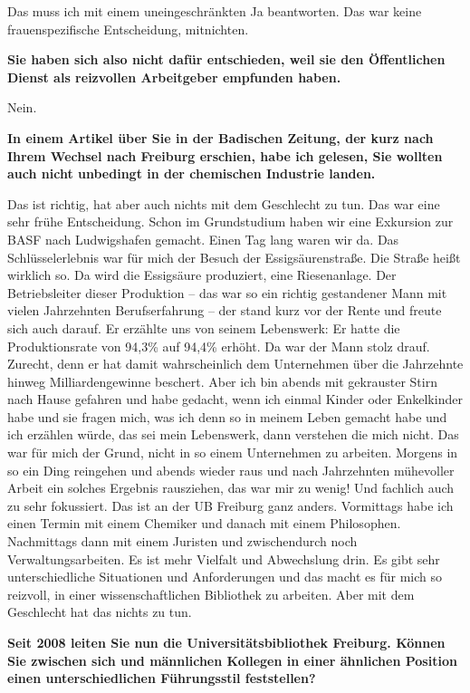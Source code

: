 \documentclass[a4paper,
fontsize=11pt,
oneside,
numbers=noperiodatend,
parskip=half-,
bibliography=totoc,
final
]{scrartcl}
\begin{document}
Das muss ich mit einem uneingeschränkten Ja beantworten. Das war keine
frauenspezifische Entscheidung, mitnichten.

\textbf{Sie haben sich also nicht dafür entschieden, weil sie den
Öffentlichen Dienst als reizvollen Arbeitgeber empfunden haben.}

Nein.

\textbf{In einem Artikel über Sie in der Badischen Zeitung, der kurz
nach Ihrem Wechsel nach Freiburg erschien, habe ich gelesen, Sie wollten
auch nicht unbedingt in der chemischen Industrie landen.}

Das ist richtig, hat aber auch nichts mit dem Geschlecht zu tun. Das war
eine sehr frühe Entscheidung. Schon im Grundstudium haben wir eine
Exkursion zur BASF nach Ludwigshafen gemacht. Einen Tag lang waren wir
da. Das Schlüsselerlebnis war für mich der Besuch der Essigsäurenstraße.
Die Straße heißt wirklich so. Da wird die Essigsäure produziert, eine
Riesenanlage. Der Betriebsleiter dieser Produktion -- das war so ein
richtig gestandener Mann mit vielen Jahrzehnten Berufserfahrung -- der
stand kurz vor der Rente und freute sich auch darauf. Er erzählte uns
von seinem Lebenswerk: Er hatte die Produktionsrate von 94,3\% auf
94,4\% erhöht. Da war der Mann stolz drauf. Zurecht, denn er hat damit
wahrscheinlich dem Unternehmen über die Jahrzehnte hinweg
Milliardengewinne beschert. Aber ich bin abends mit gekrauster Stirn
nach Hause gefahren und habe gedacht, wenn ich einmal Kinder oder
Enkelkinder habe und sie fragen mich, was ich denn so in meinem Leben
gemacht habe und ich erzählen würde, das sei mein Lebenswerk, dann
verstehen die mich nicht. Das war für mich der Grund, nicht in so einem
Unternehmen zu arbeiten. Morgens in so ein Ding reingehen und abends
wieder raus und nach Jahrzehnten mühevoller Arbeit ein solches Ergebnis
rausziehen, das war mir zu wenig! Und fachlich auch zu sehr fokussiert.
Das ist an der UB Freiburg ganz anders. Vormittags habe ich einen Termin
mit einem Chemiker und danach mit einem Philosophen. Nachmittags dann
mit einem Juristen und zwischendurch noch Verwaltungsarbeiten. Es ist
mehr Vielfalt und Abwechslung drin. Es gibt sehr unterschiedliche
Situationen und Anforderungen und das macht es für mich so reizvoll, in
einer wissenschaftlichen Bibliothek zu arbeiten. Aber mit dem Geschlecht
hat das nichts zu tun.

\textbf{Seit 2008 leiten Sie nun die Universitätsbibliothek Freiburg.
Können Sie zwischen sich und männlichen Kollegen in einer ähnlichen
Position einen unterschiedlichen Führungsstil feststellen?}
\end{document}
